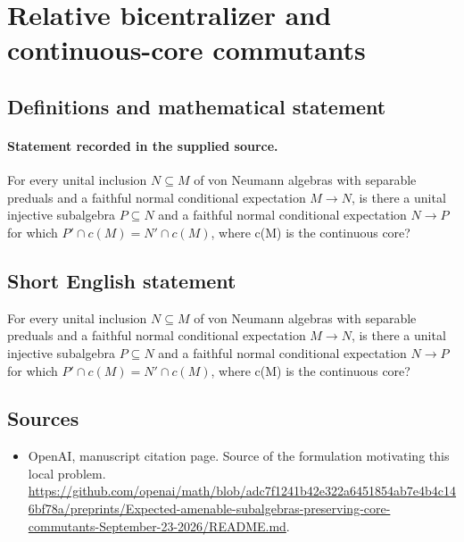 \documentclass[11pt]{article}
\begin{document}
\section*{Relative bicentralizer and continuous-core commutants}\label{30007311}
\subsection{Definitions and mathematical statement}
\paragraph{Statement recorded in the supplied source.}
For every unital inclusion $N\subseteq M$ of von Neumann algebras with separable preduals and a faithful normal conditional expectation $M\to N$, is there a unital injective subalgebra $P\subseteq N$ and a faithful normal conditional expectation $N\to P$ for which $P\prime \cap c(M)=N\prime \cap c(M)$, where c(M) is the continuous core?
\subsection{Short English statement}
For every unital inclusion $N\subseteq M$ of von Neumann algebras with separable preduals and a faithful normal conditional expectation $M\to N$, is there a unital injective subalgebra $P\subseteq N$ and a faithful normal conditional expectation $N\to P$ for which $P\prime \cap c(M)=N\prime \cap c(M)$, where c(M) is the continuous core?
\subsection{Sources}
\begin{itemize}
\item[S1] OpenAI, manuscript citation page. Source of the formulation motivating this local problem.
\url{https://github.com/openai/math/blob/adc7f1241b42e322a6451854ab7e4b4c146bf78a/preprints/Expected-amenable-subalgebras-preserving-core-commutants-September-23-2026/README.md}.
\end{itemize}
\end{document}
